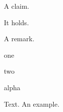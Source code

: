 \documentclass{lipics-v2021}
\begin{document}
\begin{claim}A claim.\end{claim}
\begin{claimproof}It holds.\end{claimproof}
\begin{remark*}A remark.\end{remark*}
\begin{romanenumerate}\item one\item two\end{romanenumerate}
\begin{alphaenumerate}\item alpha\end{alphaenumerate}
Text.
An example.\lipicsEnd
\end{document}
